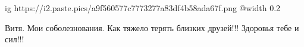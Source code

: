  
 
 
 
 
\zzSecCmt

\begin{itemize} %

\ifcmt
  ig https://i2.paste.pics/a9f560577c7773277a83df4b58ada67f.png
  @width 0.2
\fi

Витя. Мои соболезнования. Как тяжело терять близких друзей!!! Здоровья тебе и сил!!!
\end{itemize} %

